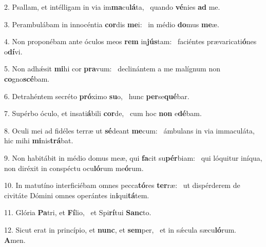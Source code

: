 2. Psallam, et intélligam in via im\textbf{ma}cu\textbf{lá}ta, \ast\  quando \textbf{vé}nies \textbf{ad} me.\

3. Perambulábam in innocéntia \textbf{cor}dis \textbf{me}i: \ast\  in médio \textbf{do}mus \textbf{me}æ.\

4. Non proponébam ante óculos meos \textbf{rem} in\textbf{jús}tam: \ast\  faciéntes prævaricati\textbf{ó}nes o\textbf{dí}vi.\

5. Non adhǽsit \textbf{mi}hi cor \textbf{pra}vum: \ast\  declinántem a me malígnum non \textbf{co}gno\textbf{scé}bam.\

6. Detrahéntem secréto \textbf{pró}ximo \textbf{su}o, \ast\  hunc \textbf{per}se\textbf{qué}bar.\

7. Supérbo óculo, et insati\textbf{á}bili \textbf{cor}de, \ast\  cum hoc \textbf{non} e\textbf{dé}bam.\

8. Oculi mei ad fidéles terræ ut \textbf{sé}deant \textbf{me}cum: \ast\  ámbulans in via immaculáta, hic mihi \textbf{mi}nis\textbf{trá}bat.\

9. Non habitábit in médio domus meæ, qui \textbf{fa}cit su\textbf{pér}biam: \ast\  qui lóquitur iníqua, non diréxit in conspéctu ocu\textbf{ló}rum me\textbf{ó}rum.\

10. In matutíno interficiébam omnes pecca\textbf{tó}res \textbf{ter}ræ: \ast\  ut dispérderem de civitáte Dómini omnes operántes in\textbf{i}qui\textbf{tá}tem.\

11. Glória \textbf{Pa}tri, et \textbf{Fí}lio, \ast\  et Spi\textbf{rí}tui \textbf{Sanc}to.\

12. Sicut erat in princípio, et \textbf{nunc}, et \textbf{sem}per, \ast\  et in sǽcula sæcu\textbf{ló}rum. \textbf{A}men.\

